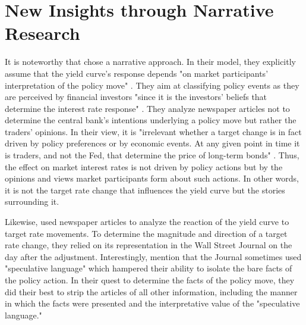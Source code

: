 \documentclass[11pt,a4paper,english,oneside]{book}
\numberwithin{equation}{chapter}
\begin{document}
%
%

%
%
%
%
%

\section{New Insights through Narrative Research} \label{NewInsights}

It is noteworthy that \cite{Ellingsen.2003} chose a narrative approach. In their model, they explicitly assume that the yield curve's response depends "on market participants’ interpretation of the policy move" \citep[~p. 1603]{Ellingsen.2001}. They aim at classifying policy events as they are perceived by financial investors "since it is the investors’ beliefs that determine the interest rate response" \citep[~p. 1604]{Ellingsen.2001}. They analyze newspaper articles not to determine the central bank's intentions underlying a policy move but rather the traders' opinions. In their view, it is "irrelevant whether a target change is in fact driven by policy preferences or by economic events. At any given point in time it is traders, and not the Fed, that determine the price of long-term bonds" \cite[~p. 2]{Ellingsen.2003}. Thus, the effect on market interest rates is not driven by policy actions but by the opinions and views market participants form about such actions. In other words, it is not the target rate change that influences the yield curve but the stories surrounding it.

Likewise, \cite{Cook.1989} used newspaper articles to analyze the reaction of the yield curve to target rate movements. To determine the magnitude and direction of a target rate change, they relied on its representation in the Wall Street Journal on the day after the adjustment. Interestingly, \citet[~p. 337]{Cook.1989} mention that the Journal sometimes used "speculative language" which hampered their ability to isolate the bare facts of the policy action. In their quest to determine the facts of the policy move, they did their best to strip the articles of all other information, including the manner in which the facts were presented and the interpretative value of the "speculative language." 
\end{document}
